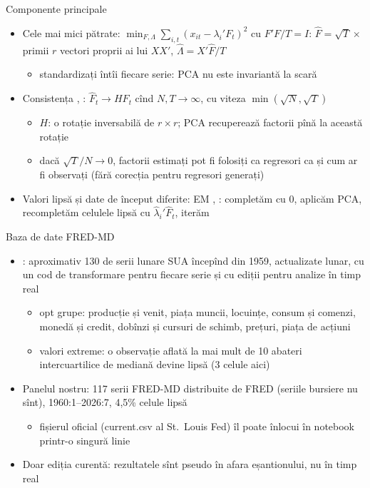\begin{frame}{Componente principale}
\itemsize{\small}
\begin{itemize}
    \item Cele mai mici pătrate: $\min_{F, \Lambda}\sum_{i,t}(x_{it} - \lambda_i'F_t)^2$ cu $F'F/T = I$: $\hat F = \sqrt T\times$ primii $r$ vectori proprii ai lui $XX'$, $\hat\Lambda = X'\hat F/T$
    \begin{itemize}
        \item standardizați întîi fiecare serie: PCA nu este invariantă la scară
    \end{itemize}
    \item Consistența , : $\hat F_t \to HF_t$ cînd $N, T \to \infty$, cu viteza $\min(\sqrt N, \sqrt T)$
    \begin{itemize}
        \item $H$: o rotație inversabilă de $r\times r$; PCA recuperează factorii pînă la această rotație
        \item dacă $\sqrt T/N \to 0$, factorii estimați pot fi folosiți ca regresori ca și cum ar fi observați (fără corecția pentru regresori generați)
    \end{itemize}
    \item Valori lipsă și date de început diferite: EM , : completăm cu 0, aplicăm PCA, recompletăm celulele lipsă cu $\hat\lambda_i'\hat F_t$, iterăm
\end{itemize}
\end{frame}

\begin{frame}{Baza de date FRED-MD}
\itemsize{\small}
\begin{itemize}
    \item {}: aproximativ 130 de serii lunare SUA începînd din 1959, actualizate lunar, cu un cod de transformare pentru fiecare serie și cu ediții pentru analize în timp real
    \begin{itemize}
        \item opt grupe: producție și venit, piața muncii, locuințe, consum și comenzi, monedă și credit, dobînzi și cursuri de schimb, prețuri, piața de acțiuni
        \item valori extreme: o observație aflată la mai mult de 10 abateri intercuartilice de mediană devine lipsă (3 celule aici)
    \end{itemize}
    \item Panelul nostru: 117 serii FRED-MD distribuite de FRED (seriile bursiere nu sînt), 1960:1--2026:7, 4{,}5\% celule lipsă
    \begin{itemize}
        \item fișierul oficial (current.csv al St.~Louis Fed) îl poate înlocui în notebook printr-o singură linie
    \end{itemize}
    \item Doar ediția curentă: rezultatele sînt pseudo în afara eșantionului, nu în timp real 
\end{itemize}
\end{frame}


